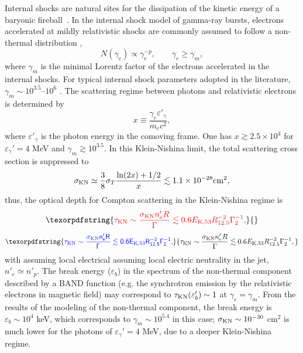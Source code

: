 \documentclass[linenumbers,twocolumn]{aastex631}
\providecommand{\DIFaddtex}[1]{{\protect\color{blue} \sf #1}} %
\providecommand{\DIFdeltex}[1]{{\protect\color{red} \scriptsize #1}} %
\providecommand{\DIFaddbegin}{} %
\providecommand{\DIFaddend}{} %
\providecommand{\DIFdelbegin}{} %
\providecommand{\DIFdelend}{} %
\providecommand{\DIFadd}[1]{\texorpdfstring{\DIFaddtex{#1}}{#1}} %
\providecommand{\DIFdel}[1]{\texorpdfstring{\DIFdeltex{#1}}{}} %
\begin{document}
Internal shocks are natural sites for the dissipation of the kinetic energy of a baryonic fireball~\citep[][]{1990ApJ...365L..55S,1992MNRAS.258P..41R,1993ApJ...405..278M,1994ApJ...430L..93R}.
In the internal shock model of gamma-ray bursts, electrons accelerated at mildly relativistic shocks are commonly assumed to follow a non-thermal distribution \citep{2004RvMP...76.1143P},
\begin{equation}
N(\gamma_e) \propto \gamma_e^{-p}, \qquad \gamma_e \ge \gamma_m ,
\end{equation}
where $\gamma_m$ is the minimal Lorentz factor of the electrons accelerated in the internal shocks.
For typical internal shock parameters adopted in the literature, $\gamma_m \sim 10^{3.5}$--$10^6$ \citep{2013ApJ...769...69B,2019A&A...628A..59O}. The scattering regime between photons and relativistic electrons is determined by
\begin{equation}
x \equiv \frac{\gamma_e \varepsilon'_\gamma}{m_e c^2},
\end{equation}
where $\varepsilon'_\gamma$ is the photon energy in the comoving frame. One has $x \gtrsim 2.5\times 10^4$ for $\varepsilon_\gamma'=4$ MeV and $\gamma_m\gtrsim10^{3.5}$. In this Klein-Nishina limit, the total scattering cross section is suppressed to \citep{1986rpa..book.....R}
\begin{equation}
\sigma_{\rm KN} \simeq 
\frac{3}{8}\sigma_T
\frac{\ln(2x)+1/2}{x} 
\lesssim 1.1 \times 10^{-28} {\rm cm}^2,
\label{eq:sigmaKN-GBM}
\end{equation}
thus, the optical depth for Compton scattering in the Klein-Nishina regime is 
\DIFdelbegin \begin{displaymath}
\DIFdel{\tau_{\rm KN} \sim \frac{\sigma_{\rm KN} n'_e R}{\Gamma}
\lesssim 0.6 E_{\rm K, 53}R_{12.5}^{-2} \Gamma_2^{-1},
}\end{displaymath}%
\DIFdelend \DIFaddbegin \begin{equation}
\DIFadd{\tau_{\rm KN} \sim \frac{\sigma_{\rm KN} n'_e R}{\Gamma}
\lesssim 0.6 E_{\rm K, 53}R_{12.5}^{-2} \Gamma_2^{-1},
\label{eq:tauKN-GBM}
}\end{equation}\DIFaddend 
\DIFdelbegin \DIFdel{with assuming local electrical }\DIFdelend \DIFaddbegin \DIFadd{assuming local electric }\DIFaddend neutrality in the jet, $n'_{e}\simeq n'_p$. The break energy ($\varepsilon_b$) in the spectrum of the non-thermal component described by a BAND function (e.g. the synchrotron emission by the relativistic electrons in magnetic field) may correspond to $\tau_{\rm KN} (\varepsilon_b')\sim1$ at $\gamma_e=\gamma_m$. From the results of the modeling of the non-thermal component, the break energy is $\varepsilon_b\sim10^4$ keV, which corresponds to $\gamma_m\sim10^{5.4}$ in this case; $\sigma_{\rm KN}\sim10^{-30}$ cm$^{2}$ is much lower for the photons of $\varepsilon_\gamma'=4$ MeV, due to a deeper Klein-Nishina regime.
\end{document}
